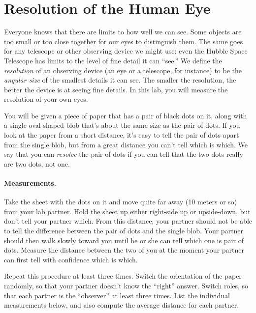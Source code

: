 \section{Resolution of the Human Eye}

\makelabheader

\bigskip
Everyone knows that there are limits to how well we can see. Some
objects are too small or too close together for our eyes to distinguish
them. The same goes for any telescope or other observing device we
might use: even the Hubble Space Telescope has limits to the level of fine
detail it can ``see.''
We define the \textit{resolution} of an observing device (an eye
or a  telescope,
for instance) to be the \textit{angular size} of
the smallest details it can see. The smaller the resolution, the
better the device is at seeing fine details.
In this lab, you will measure the resolution of your own eyes.

You will be given a piece of paper that has a pair of black dots on it,
along with a single oval-shaped blob that's about the same size as the
pair of dots. If you look at the paper from a short distance, it's
easy to tell the pair of dots apart from the single blob, but from
a great distance you can't tell which is which.
We say that you can \textit{resolve} the pair of dots if you
can tell that the two dots really are two dots, not one.

\paragraph{Measurements.}
Take the sheet with the dots on it and move quite far away (10 meters
or so) from your lab partner. Hold the sheet up either right-side up
or upside-down, but don't tell your partner which. From this
distance, your partner should not be able to tell the difference
between the pair of dots and the single blob.
Your partner
should then walk slowly toward you until he or she can tell which 
one is pair of dots. Measure the distance between the two of you
at the moment your partner can first tell with confidence
which is which.

Repeat this procedure at least three times. Switch the orientation
of the paper randomly, so that your partner doesn't know the ``right''
answer. Switch roles, so that each partner is the ``observer'' 
at least three times.
List the individual measurements below, and
also compute the average distance for each partner.

\vfil\eject

